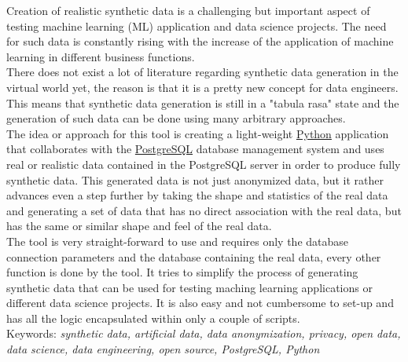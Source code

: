 Creation of realistic synthetic data is a challenging but important aspect of testing machine learning (ML) application and data science projects. The need for such data is constantly rising with the increase of the application of machine learning in different business functions.\\
\newline
There does not exist a lot of literature regarding synthetic data generation in the virtual world yet, the reason is that it is a pretty new concept for data engineers. This means that synthetic data generation is still in a "tabula rasa" state and the generation of such data can be done using many arbitrary approaches.\\
\newline
The idea or approach for this tool is creating a light-weight \href{https://en.wikipedia.org/wiki/Python_(programming_language)}{Python} application that collaborates with the \href{https://en.wikipedia.org/wiki/PostgreSQL}{PostgreSQL} database management system and uses real or realistic data contained in the PostgreSQL server in order to produce fully synthetic data. This generated data is not just anonymized data, but it rather advances even a step further by taking the shape and statistics of the real data and generating a set of data that has no direct association with the real data, but has the same or similar shape and feel of the real data.\\
\newline
The tool is very straight-forward to use and requires only the database connection parameters and the database containing the real data, every other function is done by the tool. It tries to simplify the process of generating synthetic data that can be used for testing maching learning applications or different data science projects. It is also easy and not cumbersome to set-up and has all the logic encapsulated within only a couple of scripts.\\
\newline
Keywords: \textit{synthetic data, artificial data, data anonymization, privacy, open data, data science, data engineering, open source, PostgreSQL, Python}